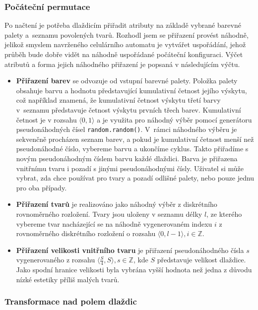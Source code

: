 \subsubsection*{Počáteční permutace}

Po načtení je potřeba dlaždicím přiřadit atributy na základě vybrané barevné palety a~seznamu povolených tvarů. Rozhodl jsem se přiřazení provést náhodně, jelikož smyslem navrženého celulárního automatu je vytvářet uspořádání, jehož průběh bude dobře vidět na náhodně uspořádané počáteční konfiguraci. Výčet atributů a forma jejich náhodného přiřazení je popsaná v následujícím výčtu.

\begin{itemize}
    \item \textbf{Přiřazení barev} se odvozuje od vstupní barevné palety. Položka palety obsahuje barvu a hodnotu představující kumulativní četnost jejího výskytu, což například znamená, že kumulativní četnost výskytu třetí barvy v~seznamu představuje četnost výskytu prvních třech barev.
    Kumulativní četnost je v rozsahu $\langle  0, 1 \rangle$ a je využita pro náhodný výběr pomocí generátoru pseudonáhodných čísel \verb|random.random()|. V~rámci náhodného výběru je sekvenčně procházen seznam barev, a pokud je kumulativní četnost menší než pseudonáhodné číslo, vybereme barvu a ukončíme cyklus. Takto přiřadíme s novým pseudonáhodným číslem barvu každé dlaždici. Barva je přiřazena vnitřnímu tvaru i pozadí s jinými pseudonáhodnými čísly. Uživatel si může vybrat, zda chce používat pro tvary a pozadí odlišné palety, nebo pouze jednu pro oba případy.
    \item \textbf{Přiřazení tvarů} je realizováno jako náhodný výběr z diskrétního rovnoměrného rozložení. Tvary jsou uloženy v seznamu délky $l$, ze kterého vybereme tvar nacházející se na náhodně vygenerovaném indexu $i$ z rovnoměrného diskrétního rozložení o rozsahu $\langle  0, l - 1 \rangle, i \in \mathbb{Z}$.
    \item \textbf{Přiřazení velikosti vnitřního tvaru} je přiřazení pseudonáhodného čísla $s$ vygenerovaného z rozsahu $\langle  \frac{S}{4}, S\rangle, s \in \mathbb{Z}$, kde $S$ představuje velikost dlaždice. Jako spodní hranice velikosti byla vybrána vyšší hodnota než jedna z důvodu nízké estetiky příliš malých tvarů.
\end{itemize}

\subsubsection*{Transformace nad polem dlaždic}

